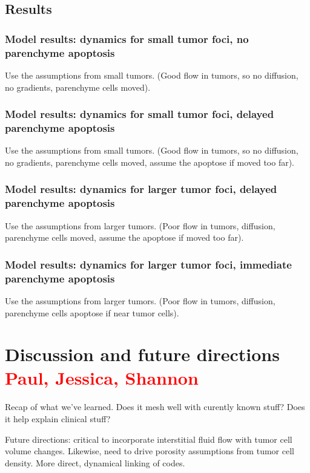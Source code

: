 \documentclass[smallextended,natbib]{svjour3}
\newcommand{\red}[1]{\textcolor{red}{#1}}
\begin{document}
\subsection{Results}

\subsubsection{Model results: dynamics for small tumor foci, no parenchyme apoptosis}
Use the assumptions from small tumors. (Good flow in tumors, so no diffusion, no gradients, parenchyme cells moved). 

\subsubsection{Model results: dynamics for small tumor foci, delayed parenchyme apoptosis} 
Use the assumptions from small tumors. (Good flow in tumors, so no diffusion, no gradients, parenchyme cells moved, 
assume the apoptose if moved too far). 

\subsubsection{Model results: dynamics for larger tumor foci, delayed parenchyme apoptosis} 
Use the assumptions from larger tumors. (Poor flow in tumors, diffusion, parenchyme cells moved, 
assume the apoptose if moved too far). 

\subsubsection{Model results: dynamics for larger tumor foci, immediate parenchyme apoptosis} 
Use the assumptions from larger tumors. (Poor flow in tumors, diffusion, parenchyme cells apoptose if near tumor cells). 





\section{Discussion and future directions \red{Paul, Jessica, Shannon}}
Recap of what we've learned. Does it mesh well with curently known stuff? Does it help explain clinical stuff? 

Future directions: critical to incorporate interstitial fluid flow with tumor cell volume changes. Likewise, need to drive porosity assumptions 
from tumor cell density. More direct, dynamical linking of codes. 
\end{document}
